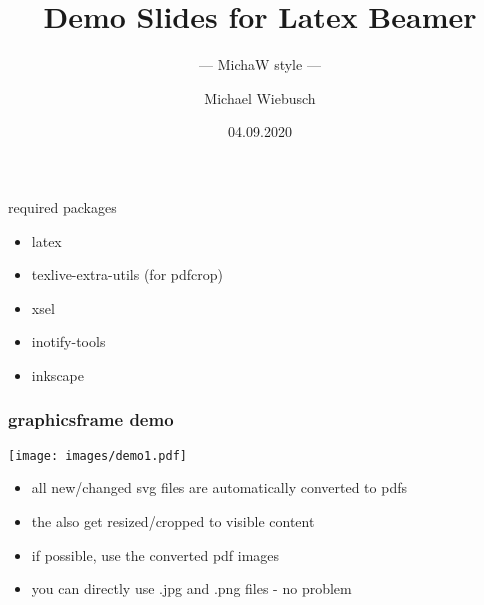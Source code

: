 \documentclass[8pt]{beamer}
\title{Demo Slides for Latex Beamer}
\subtitle{--- MichaW style ---}
\author{Michael Wiebusch}
\institute{GSI EEL - AESD}
\date{04.09.2020}
\begin{document}
\frame{\titlepage}






\begin{frame}
\frametitle{}

\begin{block}{required packages}
\begin{itemize}
\item
latex
\item
texlive-extra-utils (for pdfcrop)
\item
xsel
\item
inotify-tools
\item
inkscape
\end{itemize}
\end{block}

\end{frame}












% 
% 
% 
% 
% 
\begin{frame}
\frametitle{graphicsframe demo}

\begin{center}\texttt{[image: images/demo1.pdf]}\end{center}

\begin{itemize}
\item
all new/changed svg files are automatically converted to pdfs
\item
the also get resized/cropped to visible content
\item
if possible, use the converted pdf images
\item
you can directly use .jpg and .png files - no problem
\end{itemize}
\end{frame}
\end{document}
